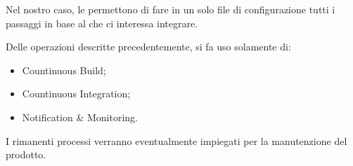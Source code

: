 		Nel nostro caso, le  permettono di fare in un solo file di configurazione tutti i passaggi in base al  che ci interessa integrare. 

		Delle operazioni descritte precedentemente, si fa uso solamente di:
		\begin{itemize}
			\item Countinuous Build;
			\item Countinuous Integration;
			\item Notification \& Monitoring.
		\end{itemize}
		I rimanenti processi verranno eventualmente impiegati per la manutenzione del prodotto.








